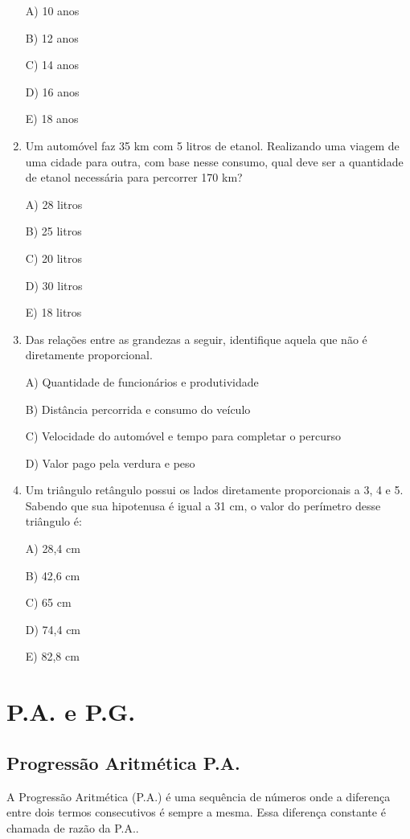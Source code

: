 \begin{multicols*}{2}
\begin{enumerate}
		      A) 10 anos

		      B) 12 anos

		      C) 14 anos

		      D) 16 anos

		      E) 18 anos

		\item Um automóvel faz 35 km com 5 litros de etanol. Realizando uma viagem de uma cidade para outra, com base nesse consumo, qual deve ser a quantidade de etanol necessária para percorrer 170 km?

		      A) 28 litros

		      B) 25 litros

		      C) 20 litros

		      D) 30 litros

		      E) 18 litros

		\item Das relações entre as grandezas a seguir, identifique aquela que não é diretamente proporcional.

		      A) Quantidade de funcionários e produtividade

		      B) Distância percorrida e consumo do veículo

		      C) Velocidade do automóvel e tempo para completar o percurso

		      D) Valor pago pela verdura e peso

		\item Um triângulo retângulo possui os lados diretamente proporcionais a 3, 4 e 5. Sabendo que sua hipotenusa é igual a 31 cm, o valor do perímetro desse triângulo é:

		      A) 28,4 cm

		      B) 42,6 cm

		      C) 65 cm

		      D) 74,4 cm

		      E) 82,8 cm

	\end{enumerate}

	\section{P.A. e P.G.}

	\subsection{Progressão Aritmética P.A.}

	A Progressão Aritmética (P.A.) é uma sequência de números onde a diferença entre dois termos consecutivos é sempre a mesma. Essa diferença constante é chamada de razão da P.A..


\end{multicols*}
